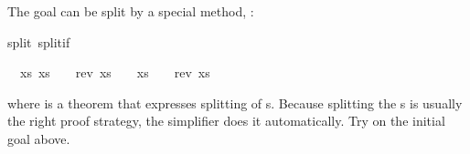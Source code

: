 \begin{isabellebody}
\isadelimproof
%
\endisadelimproof
%
\isatagproof
%
\begin{isamarkuptxt}%
\noindent
The goal can be split by a special method, :%
\end{isamarkuptxt}%
\isamarkuptrue%
\isamarkupfalse%
{\isacharparenleft}split\ split{\isacharunderscore}if{\isacharparenright}%
\begin{isamarkuptxt}%
\noindent
\begin{isabelle}%
\ {}{\isachardot}\ {\isasymforall}xs{\isachardot}\ {\isacharparenleft}xs\ {\isacharequal}\ {\isacharbrackleft}{\isacharbrackright}\ {\isasymlongrightarrow}\ rev\ xs\ {\isacharequal}\ {\isacharbrackleft}{\isacharbrackright}{\isacharparenright}\ {\isasymand}\ {\isacharparenleft}xs\ {\isasymnoteq}\ {\isacharbrackleft}{\isacharbrackright}\ {\isasymlongrightarrow}\ rev\ xs\ {\isasymnoteq}\ {\isacharbrackleft}{\isacharbrackright}{\isacharparenright}%
\end{isabelle}
where  is a theorem that expresses splitting of
s. Because
splitting the s is usually the right proof strategy, the
simplifier does it automatically.  Try 
on the initial goal above.


\end{isamarkuptxt}
\end{isabellebody}
